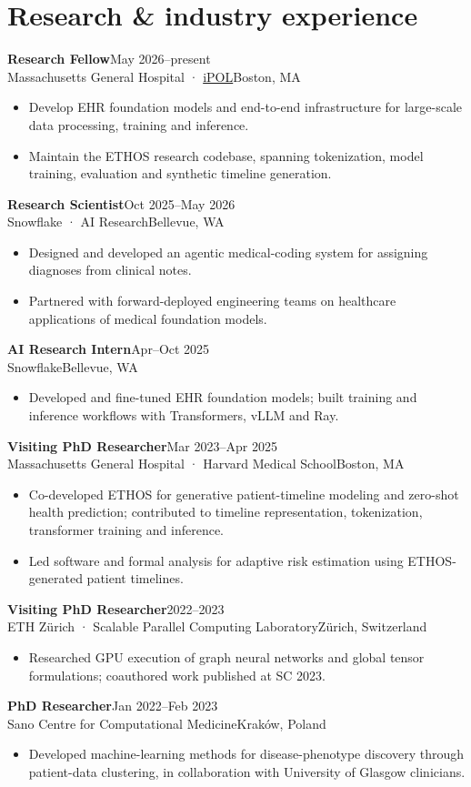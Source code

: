 \documentclass[10pt,letterpaper]{article}
\newcommand{\role}[4]{\textbf{#1}\hfill{\small #2}\\{\color{muted}#3\hfill{\small #4}}\par}
\begin{document}
\section{Research \& industry experience}
\role{Research Fellow}{May 2026–present}{Massachusetts General Hospital · \href{https://ipol.mgh.harvard.edu/}{iPOL}}{Boston, MA}
\begin{itemize}
\item Develop EHR foundation models and end-to-end infrastructure for large-scale data processing, training and inference.
\item Maintain the ETHOS research codebase, spanning tokenization, model training, evaluation and synthetic timeline generation.
\end{itemize}
\role{Research Scientist}{Oct 2025–May 2026}{Snowflake · AI Research}{Bellevue, WA}
\begin{itemize}
\item Designed and developed an agentic medical-coding system for assigning diagnoses from clinical notes.
\item Partnered with forward-deployed engineering teams on healthcare applications of medical foundation models.
\end{itemize}
\role{AI Research Intern}{Apr–Oct 2025}{Snowflake}{Bellevue, WA}
\begin{itemize}
\item Developed and fine-tuned EHR foundation models; built training and inference workflows with Transformers, vLLM and Ray.
\end{itemize}
\role{Visiting PhD Researcher}{Mar 2023–Apr 2025}{Massachusetts General Hospital · Harvard Medical School}{Boston, MA}
\begin{itemize}
\item Co-developed ETHOS for generative patient-timeline modeling and zero-shot health prediction; contributed to timeline representation, tokenization, transformer training and inference.
\item Led software and formal analysis for adaptive risk estimation using ETHOS-generated patient timelines.
\end{itemize}
\role{Visiting PhD Researcher}{2022–2023}{ETH Zürich · Scalable Parallel Computing Laboratory}{Zürich, Switzerland}
\begin{itemize}
\item Researched GPU execution of graph neural networks and global tensor formulations; coauthored work published at SC 2023.
\end{itemize}
\role{PhD Researcher}{Jan 2022–Feb 2023}{Sano Centre for Computational Medicine}{Kraków, Poland}
\begin{itemize}
\item Developed machine-learning methods for disease-phenotype discovery through patient-data clustering, in collaboration with University of Glasgow clinicians.
\end{itemize}
\end{document}
